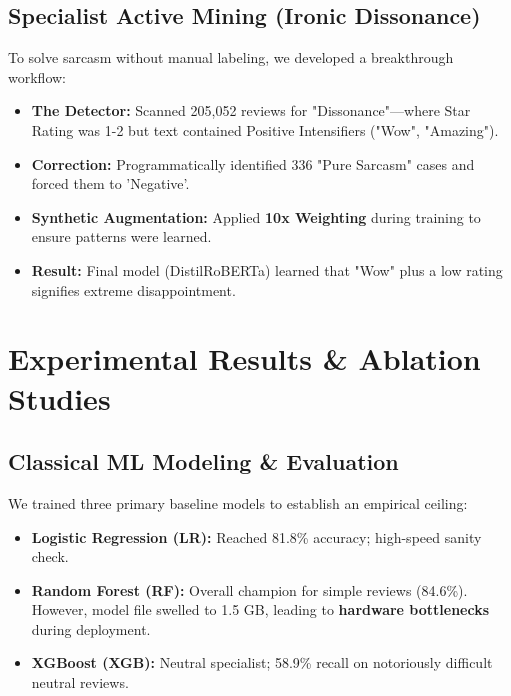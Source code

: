 \documentclass[11pt,oneside]{scrbook}
\begin{document}
\section{Specialist Active Mining (Ironic Dissonance)}
To solve sarcasm without manual labeling, we developed a breakthrough workflow:
\begin{itemize}
    \item \textbf{The Detector:} Scanned 205,052 reviews for "Dissonance"---where Star Rating was 1-2 but text contained Positive Intensifiers ("Wow", "Amazing").
    \item \textbf{Correction:} Programmatically identified 336 "Pure Sarcasm" cases and forced them to 'Negative'.
    \item \textbf{Synthetic Augmentation:} Applied \textbf{10x Weighting} during training to ensure patterns were learned.
    \item \textbf{Result:} Final model (DistilRoBERTa) learned that "Wow" plus a low rating signifies extreme disappointment.
\end{itemize}

\chapter{Experimental Results \& Ablation Studies}

\section{Classical ML Modeling \& Evaluation}
We trained three primary baseline models to establish an empirical ceiling:
\begin{itemize}
    \item \textbf{Logistic Regression (LR):} Reached 81.8\% accuracy; high-speed sanity check.
    \item \textbf{Random Forest (RF):} Overall champion for simple reviews (84.6\%). However, model file swelled to 1.5 GB, leading to \textbf{hardware bottlenecks} during deployment.
    \item \textbf{XGBoost (XGB):} Neutral specialist; 58.9\% recall on notoriously difficult neutral reviews.
\end{itemize}
\end{document}
